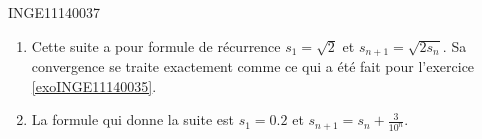 

\begin{corrige}{INGE11140037}

	\begin{enumerate}

		\item
			Cette suite a pour formule de récurrence $s_1=\sqrt{2}$ et $s_{n+1}=\sqrt{2s_{n}}$. Sa convergence se traite exactement comme ce qui a été fait pour l'exercice \ref{exoINGE11140035}.

		\item
			La formule qui donne la suite est $s_1=0.2$ et $s_{n+1}=s_n+\frac{ 3 }{ 10^n }$.

	\end{enumerate}

\end{corrige}
